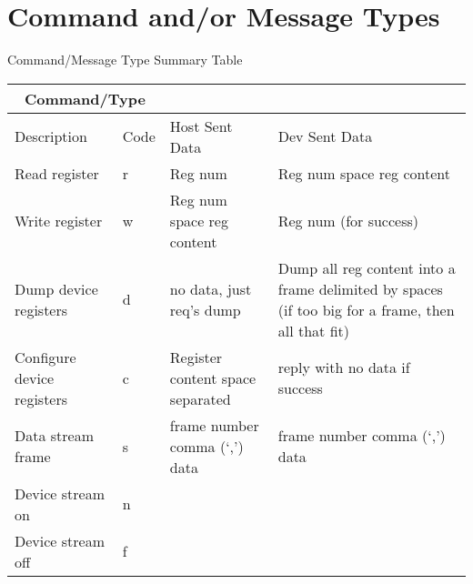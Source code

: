 \documentclass{customdocclass}
\begin{document}
\section{Command and/or Message Types}

\begin{center}
\small
Command/Message Type Summary Table
\begin{tabularx}{\textwidth}{|X|l|X|X|} \hline
\multicolumn{2}{|c|}{Command/Type} & & \\ \hline
Description & Code & Host Sent Data & Dev Sent Data \\ \hline
Read register & r & Reg num & Reg num space reg content \\ \hline
Write register & w & Reg num space reg content & Reg num (for success) \\ \hline
Dump device registers & d & no data, just req's dump & Dump all reg content into a frame delimited by spaces (if too big for a frame, then all that fit) \\ \hline
Configure device registers & c & Register content space separated & reply with no data if success \\ \hline
Data stream frame & s & frame number comma (`,') data &  frame number comma (`,') data \\ \hline
Device stream on & n & & \\ \hline
Device stream off & f & & \\ \hline
\end{tabularx}
\end{center}
\end{document}
